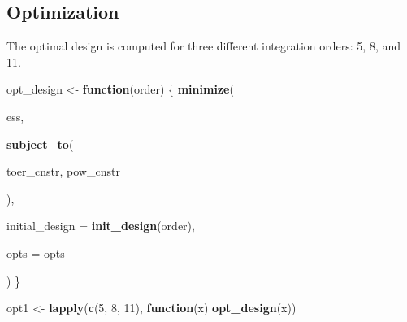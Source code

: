 \documentclass[]{book}
\newenvironment{Shaded}{\begin{snugshade}}{\end{snugshade}}
\newcommand{\ControlFlowTok}[1]{\textcolor[rgb]{0.13,0.29,0.53}{\textbf{#1}}}
\newcommand{\DataTypeTok}[1]{\textcolor[rgb]{0.13,0.29,0.53}{#1}}
\newcommand{\DecValTok}[1]{\textcolor[rgb]{0.00,0.00,0.81}{#1}}
\newcommand{\FloatTok}[1]{\textcolor[rgb]{0.00,0.00,0.81}{#1}}
\newcommand{\KeywordTok}[1]{\textcolor[rgb]{0.13,0.29,0.53}{\textbf{#1}}}
\newcommand{\NormalTok}[1]{#1}
\newcommand{\OperatorTok}[1]{\textcolor[rgb]{0.81,0.36,0.00}{\textbf{#1}}}
\newcommand{\StringTok}[1]{\textcolor[rgb]{0.31,0.60,0.02}{#1}}
\begin{document}
\begin{Shaded}
\end{Shaded}

\hypertarget{optimization-9}{%
\subsection{Optimization}\label{optimization-9}}

The optimal design is computed for three different integration orders: 5, 8,
and 11.

\begin{Shaded}
\begin{Highlighting}[]
\NormalTok{opt_design <-}\StringTok{ }\ControlFlowTok{function}\NormalTok{(order) \{}
    \KeywordTok{minimize}\NormalTok{(}
        
\NormalTok{        ess,}
        
        \KeywordTok{subject_to}\NormalTok{(}
            
\NormalTok{            toer_cnstr,}
\NormalTok{            pow_cnstr}
            
\NormalTok{        ),}
        
        \DataTypeTok{initial_design =} \KeywordTok{init_design}\NormalTok{(order),}
        
        \DataTypeTok{opts =}\NormalTok{ opts}
        
\NormalTok{)}
\NormalTok{\}}

\NormalTok{opt1 <-}\StringTok{ }\KeywordTok{lapply}\NormalTok{(}\KeywordTok{c}\NormalTok{(}\DecValTok{5}\NormalTok{, }\DecValTok{8}\NormalTok{, }\DecValTok{11}\NormalTok{), }\ControlFlowTok{function}\NormalTok{(x) }\KeywordTok{opt_design}\NormalTok{(x))}
\end{Highlighting}
\end{Shaded}
\end{document}
